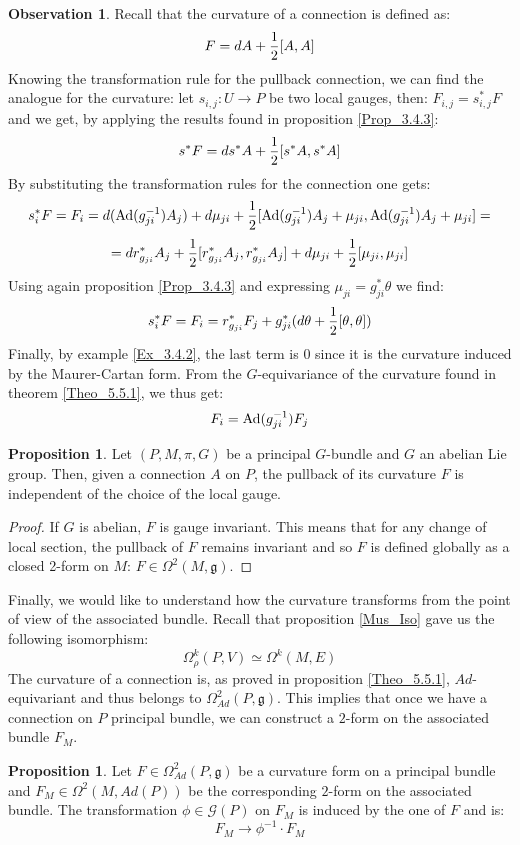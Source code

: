 \documentclass[12pt,a4paper]{report}
\theoremstyle{definition}
\theoremstyle{Theorem}
\newtheorem{Prop}[Def]{Proposition}
\theoremstyle{definition}
\theoremstyle{definition}
\newtheorem{Obs}[Def]{Observation}
\begin{document}
	\begin{Obs}\label{Obs_7.2.2}
		Recall that the curvature of a connection is defined as:
		$$F=dA+{1\over 2}[A,A]$$
		Knowing the transformation rule for the pullback connection, we can find the analogue for the curvature: let $s_{i,j}:U\rightarrow P$ be two local gauges, then: $F_{i,j}=s_{i,j}^*F$ and we get, by applying the results found in proposition \ref{Prop_3.4.3}:
		$$s^*F=ds^*A+{1\over 2}[s^*A,s^*A]$$
		By substituting the transformation rules for the connection one gets:
		$$s_i^*F=F_i=d(\hbox{Ad}(g_{ji}^{-1})A_j)+d\mu_{ji}+{1\over 2}[\hbox{Ad}(g_{ji}^{-1})A_j+\mu_{ji},\hbox{Ad}(g_{ji}^{-1})A_j+\mu_{ji}]=$$
		$$=dr^*_{g_{ji}}A_j+{1\over 2}[r^*_{g_{ji}}A_j,r^*_{g_{ji}}A_j]+d\mu_{ji}+{1\over 2}[\mu_{ji},\mu_{ji}]$$
		Using again proposition \ref{Prop_3.4.3} and expressing $\mu_{ji}=g_{ji}^*\theta$ we find:
		$$s_i^*F=F_i=r^*_{g_{ji}}F_j+g_{ji}^*(d\theta+{1\over 2}[\theta,\theta])$$
		Finally, by example \ref{Ex_3.4.2}, the last term is 0 since it is the curvature induced by the Maurer-Cartan form. From the $G$-equivariance of the curvature found in theorem \ref{Theo_5.5.1}, we thus get:
		$$F_i=\hbox{Ad}(g_{ji}^{-1})F_j$$
	\end{Obs}
	\begin{Prop}\label{Prop_7.2.2}
		Let $(P,M,\pi,G)$ be a principal $G$-bundle and $G$ an abelian Lie group. Then, given a connection $A$ on $P$, the pullback of its curvature $F$ is independent of the choice of the local gauge.
	\end{Prop}
	\begin{proof}
		If $G$ is abelian, $F$ is gauge invariant. This means that for any change of local section, the pullback of $F$ remains invariant and so $F$ is defined globally as a closed 2-form on $M$: $F\in \Omega^2(M,\mathfrak{g})$.
	\end{proof}
	Finally, we would like to understand how the curvature transforms from the point of view of the associated bundle. Recall that proposition \ref{Mus_Iso} gave us the following isomorphism:
	$$\Omega^k_\rho(P,V)\simeq \Omega^k(M,E)$$
	The curvature of a connection is, as proved in proposition \ref{Theo_5.5.1}, $Ad$-equivariant and thus belongs to $\Omega^2_{Ad}(P,\mathfrak{g})$. This implies that once we have a connection on $P$ principal bundle, we can construct a $2$-form on the associated bundle $F_M$.
	\begin{Prop}\label{Prop_7.2.3}
		Let $F\in \Omega^2_{Ad}(P,\mathfrak{g})$ be a curvature form on a principal bundle and $F_M\in\Omega^2(M,Ad(P))$ be the corresponding $2$-form on the associated bundle. The transformation $\phi\in\mathcal{G}(P)$ on $F_M$ is induced by the one of $F$ and is:
		$$F_M\rightarrow \phi^{-1}\cdot F_M$$
	\end{Prop}
\end{document}
